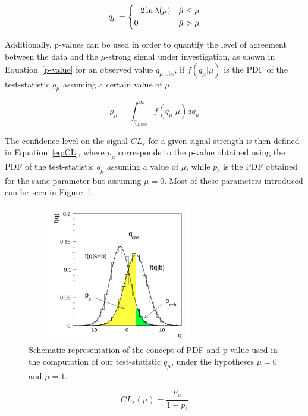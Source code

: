 \documentclass[a4paper, 10pt, openright]{report}
\begin{document}
\begin{equation}
\label{eq:q}
q_\mu = 
\begin{dcases}
-2 \ln \lambda(\mu) & \hat{\mu} \leq \mu \\
0 & \hat{\mu} > \mu
\end{dcases}
\end{equation}

Additionally, p-values can be used in order to quantify the level of agreement between the data and the $\mu$-strong signal under investigation, as shown in Equation~\ref{p-value} for an observed value $q_{\mu, \text{obs}}$, if $f(q_\mu|\mu)$ is the \ac{PDF} of the test-statistic $q_\mu$ assuming a certain value of $\mu$.

\begin{equation}
\label{p-value}
p_\mu = \int_{q_{\mu, \text{obs}}}^\infty f(q_\mu|\mu) dq_\mu 
\end{equation}

The confidence level on the signal $CL_s$ for a given signal strength is then defined in Equation~\ref{eq:CL}, where $p_\mu$ corresponds to the p-value obtained using the \ac{PDF} of the test-statistic $q_\mu$ assuming a value of $\mu$, while $p_b$ is the \ac{PDF} obtained for the same parameter but assuming $\mu = 0$. Most of these parameters introduced can be seen in Figure~\ref{fig:stat}.

\begin{figure}[htbp]
\centering
\includegraphics[width=8cm, height=6cm]{figs/stat.png}
\caption{Schematic representation of the concept of \ac{PDF} and p-value used in the computation of our test-statistic $q_\mu$, under the hypotheses $\mu = 0$ and $\mu = 1$.}
\label{fig:stat}
\end{figure}

\begin{equation}
\label{eq:CL}
CL_s(\mu) = \frac{p_\mu}{1-p_b}
\end{equation}
\end{document}
